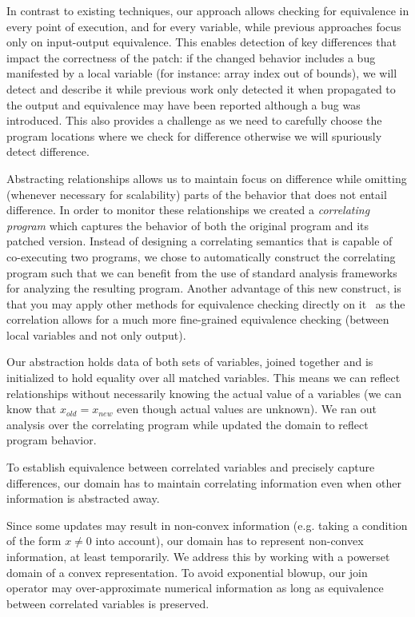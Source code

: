 In contrast to existing techniques, our approach allows checking for
equivalence in every point of execution, and for every variable, while
previous approaches focus only on input-output equivalence. This enables
detection of key differences that impact the correctness of the patch: if the
changed behavior includes a bug manifested by a local variable (for instance:
array index out of bounds), we will detect and describe it while previous
work only detected it when propagated to the output and equivalence may have
been reported although a bug was introduced. This also provides a challenge
as we need to carefully choose the program locations where we check for
difference otherwise we will spuriously detect difference.

Abstracting relationships allows us to maintain focus on difference while
omitting (whenever necessary for scalability) parts of the behavior that does
not entail difference. In order to monitor these relationships we created a
\emph{correlating program} which captures the behavior of both the original
program and its patched version. Instead of designing a correlating semantics
that is capable of co-executing two programs, we chose to automatically
construct the correlating program such that we can benefit from the use of
standard analysis frameworks for analyzing the resulting program. Another
advantage of this new construct, is that you may apply other methods for
equivalence checking directly on it~\cite{EnglerRamos11} as the correlation
allows for a much more fine-grained equivalence checking (between local
variables and not only output).

Our abstraction holds data of both sets of variables, joined together and is
initialized to hold equality over all matched variables. This means we can
reflect relationships without necessarily knowing the actual value of a
variables (we can know that $x_{old} = x_{new}$ even though actual values are
unknown). We ran out analysis over the correlating program while updated the
domain to reflect program behavior.

To establish equivalence between correlated variables and precisely capture
differences, our domain has to maintain correlating information even when
other information is abstracted away.

Since some updates may result in non-convex information (e.g. taking  a
condition of the form $x \neq 0$ into account), our domain has to represent
non-convex information, at least temporarily. We address this by working with
a powerset domain of a convex representation. To avoid exponential blowup,
our join operator may over-approximate numerical information as long as
equivalence between correlated variables is preserved.

